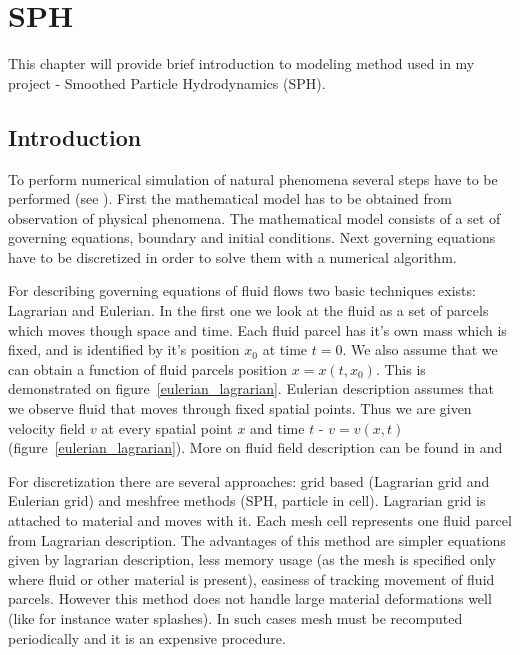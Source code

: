 

\chapter{SPH}
\label{chap:sph}


\graphicspath{{sph/figures/}}

This chapter will provide brief introduction to modeling method used in my project - Smoothed Particle Hydrodynamics (SPH).


\section{Introduction}
To perform numerical simulation of natural phenomena several steps have to be performed (see \cite[section 1.1.2]{Liu}). First the mathematical model has to be obtained from observation of physical phenomena. The mathematical model consists of a set of governing equations, boundary and initial conditions. Next governing equations have to be discretized in order to solve them with a numerical algorithm.

For describing governing equations of fluid flows two basic techniques exists: Lagrarian and Eulerian. In the first one we look at the fluid as a set of parcels which moves though space and time. Each fluid parcel has it's own mass which is fixed, and is identified by it's position $x_0$ at time $t = 0$. We also assume that we can obtain a function of fluid parcels position $x = x(t, x_0)$. This is demonstrated on figure~\ref{eulerian_lagrarian}.
Eulerian description assumes that we observe fluid that moves through fixed spatial points. Thus we are given velocity field $v$ at every spatial point $x$ and time $t$ - $v = v(x, t)$ (figure~\ref{eulerian_lagrarian}). 
More on fluid field description can be found in \cite[section 2.1]{Hauke2008} and \cite{Price06}


For discretization there are several approaches: grid based (Lagrarian grid and Eulerian grid) and meshfree methods (SPH, particle in cell).
Lagrarian grid is attached to material and moves with it. Each mesh cell represents one fluid parcel from Lagrarian description. The advantages of this method are simpler equations given by lagrarian description, less memory usage (as the mesh is specified only where fluid or other material is present), easiness of tracking movement of fluid parcels. However this method does not handle large material deformations well (like for instance water splashes). In such cases mesh must be recomputed periodically and it is an expensive procedure.

